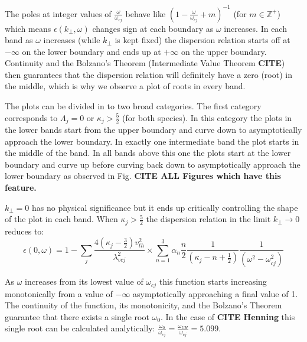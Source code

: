 \documentclass[12pt,a4paper]{article}
\begin{document}
    The poles at integer values of $\frac{\omega}{\omega_{cj}}$ behave like $(1 - \frac{\omega}{\omega_{cj}} + m)^{-1}$ (for $m \in \mathbb{Z}^+$) which means $\epsilon(k_\perp, \omega)$ changes sign at each boundary as $\omega$ increases.
    In each band as $\omega$ increases (while $k_\perp$ is kept fixed) the dispersion relation starts off at $-\infty$ on the lower boundary and ends up at $+\infty$ on the upper boundary.
    Continuity and the Bolzano's Theorem (Intermediate Value Theorem \textbf{CITE}) then guarantees that the dispersion relation will definitely have a zero (root) in the middle, which is why we observe a plot of roots in every band.

    The plots can be divided in to two broad categories.
    The first category corresponds to $\Lambda_j = 0$ or $\kappa_j > \frac{5}{2}$ (for both species).
    In this category the plots in the lower bands start from the upper boundary and curve down to asymptotically approach the lower boundary.
    In exactly one intermediate band the plot starts in the middle of the band.
    In all bands above this one the plots start at the lower boundary and curve up before curving back down to asymptotically approach the lower boundary as observed in Fig. \textbf{CITE ALL Figures which have this feature.}


    $k_\perp = 0$ has no physical significance but it ends up critically controlling the shape of the plot in each band.
    When $\kappa_j > \frac{5}{2}$ the dispersion relation in the limit $k_\perp \rightarrow 0$ reduces to:
    \begin{equation}
        \epsilon(0, \omega) = 1 - \sum_j \frac{4 (\kappa_j - \frac{3}{2}) v^2_{th}}{\lambda^2_{vcj}} \times \sum_{n = 1}^3 \alpha_n \frac{n}{2} \frac{1}{(\kappa_j - n + \frac{1}{2})} \frac{1}{(\omega^2 - \omega^2_{cj})}
    \end{equation}

    As $\omega$ increases from its lowest value of $\omega_{cj}$ this function starts increasing monotonically from a value of $-\infty$ asymptotically approaching a final value of 1.
    The continuity of the function, its monotonicity, and the Bolzano's Theorem guarantee that there exists a single root $\omega_0$.
    In the case of \textbf{CITE Henning} this single root can be calculated analytically: $\frac{\omega_0}{\omega_{cj}} = \frac{\omega_{UH}}{\omega_{cj}} = 5.099$.
\end{document}
